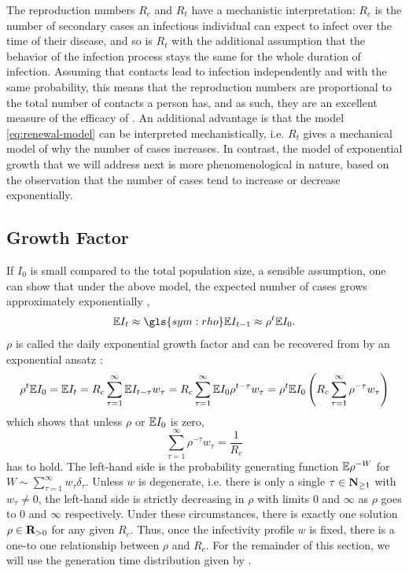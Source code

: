 The reproduction numbers $R_{c}$ and $R_{t}$ have a mechanistic interpretation: $R_{c}$ is the number of secondary cases an infectious individual can expect to infect over the time of their disease, and so is $R_{t}$ with the additional assumption that the behavior of the infection process stays the same for the whole duration of infection. 
Assuming that contacts lead to infection independently and with the same probability, this means that the reproduction numbers are proportional to the total number of contacts a person has, and as such, they are an excellent measure of the efficacy of  \citep{Brauner2021Inferring,Khazaei2023Using,Flaxman2020Estimating}. 
An additional advantage is that the model \eqref{eq:renewal-model} can be interpreted mechanistically, i.e. $R_{t}$ gives a mechanical model of why the number of cases increases. In contrast, the  model of exponential growth that we will address next is more phenomenological in nature, based on the observation that the number of cases tend to increase or decrease exponentially. 

\subsection{Growth Factor}
\label{subsec:growth_factor}
If $I_{0}$ is small compared to the total population size, a sensible assumption, one can show that under the above model, the expected number of cases grows approximately exponentially \citep[Section 1.2]{Diekmann2013Mathematical}, 
\begin{align}
    \label{eq:exponential-growth}
\E I_{t} \approx \gls{sym:rho} \E I_{t - 1} \approx \rho^{t} \E I_{0}.
\end{align}
$\rho$ is called the daily exponential growth factor and can be recovered from  by an exponential ansatz \citep{Wallinga2007How}:
$$
    \rho^{t} \mathbb E I_{0} = \mathbb E I_{t} = R_c \sum_{\tau = 1}^\infty \mathbb E I_{t - \tau}w_{\tau} = R_{c} \sum_{\tau = 1}^\infty \mathbb E I_{0} \rho^{t - \tau} w_{\tau} = \rho^{t} \mathbb E I_{0} \left( R_{c} \sum_{\tau = 1} ^{\infty} \rho^{-\tau}w_{\tau}\right)
$$
which shows that unless $\rho$ or $\mathbb E I_{0}$ is zero, 
$$
    \sum_{\tau = 1}^\infty \rho^{-\tau} w_{\tau} = \frac{1}{R_{c}}
$$
has to hold. The left-hand side is the probability generating function $\mathbb E \rho^{-W}$ for $W \sim \sum_{\tau = 1}^\infty w_{\tau}\delta_{\tau}$. 
Unless $w$ is degenerate, i.e. there is only a single $\tau \in \mathbf N_{\geq 1}$ with $w_{\tau} \neq 0$, the left-hand side is strictly decreasing in $\rho$ with limits $0$ and $\infty$ as $\rho$ goes to $0$ and $\infty$ respectively. Under these circumstances, there is exactly one solution $\rho \in \mathbf R_{>0}$ for any given $R_{c}$. 
Thus, once the infectivity profile $w$ is fixed, there is a one-to one relationship between $\rho$ and $R_{c}$. For the remainder of this section, we will use the generation time distribution given by .

